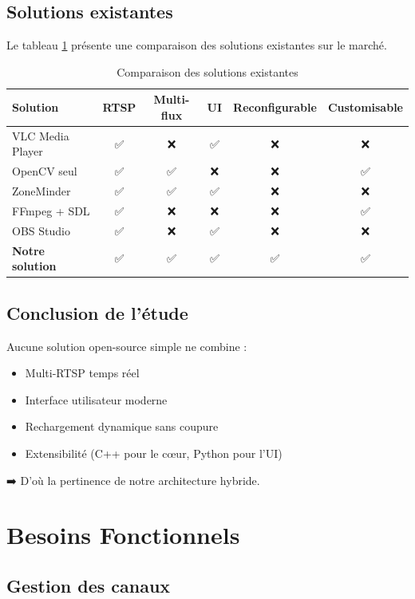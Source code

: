 \documentclass[12pt,a4paper]{report}
\begin{document}
\section{Solutions existantes}

Le tableau \ref{tab:existant} présente une comparaison des solutions existantes sur le marché.

\begin{table}[H]
    \centering
    \caption{Comparaison des solutions existantes}
    \label{tab:existant}
    \begin{tabular}{|l|c|c|c|c|c|}
        \hline
        \textbf{Solution} & \textbf{RTSP} & \textbf{Multi-flux} & \textbf{UI} & \textbf{Reconfigurable} & \textbf{Customisable} \\
        \hline
        VLC Media Player & ✅ & ❌ & ✅ & ❌ & ❌ \\
        OpenCV seul & ✅ & ✅ & ❌ & ❌ & ✅ \\
        ZoneMinder & ✅ & ✅ & ✅ & ❌ & ❌ \\
        FFmpeg + SDL & ✅ & ❌ & ❌ & ❌ & ✅ \\
        OBS Studio & ✅ & ❌ & ✅ & ❌ & ❌ \\
        \textbf{Notre solution} & ✅ & ✅ & ✅ & ✅ & ✅ \\
        \hline
    \end{tabular}
\end{table}

\section{Conclusion de l'étude}

Aucune solution open-source simple ne combine :
\begin{itemize}
    \item Multi-RTSP temps réel
    \item Interface utilisateur moderne
    \item Rechargement dynamique sans coupure
    \item Extensibilité (C++ pour le cœur, Python pour l'UI)
\end{itemize}

➡️ D'où la pertinence de notre architecture hybride.

\chapter{Besoins Fonctionnels}

\section{Gestion des canaux}
\end{document}
